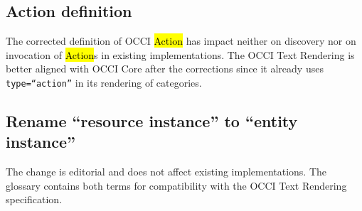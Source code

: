 \documentclass[10pt,a4paper]{article}
\begin{document}
\subsection{Action definition}

The corrected definition of OCCI \hl{Action} has impact neither on discovery
nor on invocation of \hl{Action}s in existing implementations. The OCCI Text Rendering
\cite{occi:text} is better aligned with OCCI Core after the corrections
since it already uses {\tt type=``action''} in its rendering of categories.

\subsection{Rename ``resource instance'' to ``entity instance''}

The change is editorial and does not affect existing implementations.
%
The glossary contains both terms for compatibility with the OCCI Text Rendering
\cite{occi:text} specification.
\end{document}
